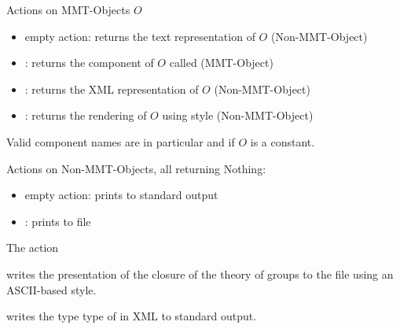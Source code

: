 \noindent
Actions on MMT-Objects $O$
\begin{itemize}
\item empty action: returns the text representation of $O$ (Non-MMT-Object)
\item {}: returns the component of $O$ called  (MMT-Object)
\item {}: returns the XML representation of $O$ (Non-MMT-Object)
\item {}: returns the rendering of $O$ using style  (Non-MMT-Object)
\end{itemize}
Valid component names  are in particular  and  if $O$ is a constant.


\noindent
Actions on Non-MMT-Objects, all returning Nothing:
\begin{itemize}
\item empty action: prints to standard output
\item {}: prints to file 
\end{itemize}

\begin{example}
The action

\noindent
{}
writes the presentation of the closure of the theory of groups to the file  using an ASCII-based style.

\noindent
{}
writes the type type of  in XML to standard output.
\end{example}